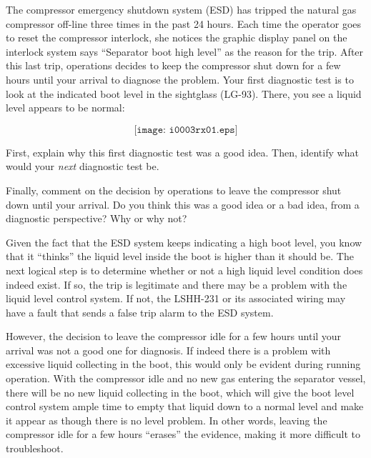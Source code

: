 

The compressor emergency shutdown system (ESD) has tripped the natural gas compressor off-line three times in the past 24 hours.  Each time the operator goes to reset the compressor interlock, she notices the graphic display panel on the interlock system says ``Separator boot high level'' as the reason for the trip.  After this last trip, operations decides to keep the compressor shut down for a few hours until your arrival to diagnose the problem.  Your first diagnostic test is to look at the indicated boot level in the sightglass (LG-93).  There, you see a liquid level appears to be normal:

$$\texttt{[image: i0003rx01.eps]}$$

First, explain why this first diagnostic test was a good idea.  Then, identify what would your {\it next} diagnostic test be.  

\vskip 10pt

Finally, comment on the decision by operations to leave the compressor shut down until your arrival.  Do you think this was a good idea or a bad idea, from a diagnostic perspective?  Why or why not?







Given the fact that the ESD system keeps indicating a high boot level, you know that it ``thinks'' the liquid level inside the boot is higher than it should be.  The next logical step is to determine whether or not a high liquid level condition does indeed exist.  If so, the trip is legitimate and there may be a problem with the liquid level control system.  If not, the LSHH-231 or its associated wiring may have a fault that sends a false trip alarm to the ESD system.

However, the decision to leave the compressor idle for a few hours until your arrival was not a good one for diagnosis.  If indeed there is a problem with excessive liquid collecting in the boot, this would only be evident during running operation.  With the compressor idle and no new gas entering the separator vessel, there will be no new liquid collecting in the boot, which will give the boot level control system ample time to empty that liquid down to a normal level and make it appear as though there is no level problem.  In other words, leaving the compressor idle for a few hours ``erases'' the evidence, making it more difficult to troubleshoot.

